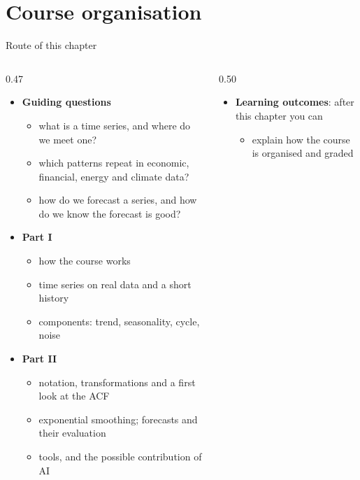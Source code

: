 \section{Course organisation}

\begin{frame}{Route of this chapter}
\itemsize{\footnotesize}
\begin{columns}[T]
\begin{column}{0.47\textwidth}
\begin{itemize}
    \item \textbf{Guiding questions}
    \begin{itemize}
        \item what is a time series, and where do we meet one?
        \item which patterns repeat in economic, financial, energy and climate data?
        \item how do we forecast a series, and how do we know the forecast is good?
    \end{itemize}
    \item \textbf{Part I}
    \begin{itemize}
        \item how the course works
        \item time series on real data and a short history
        \item components: trend, seasonality, cycle, noise
    \end{itemize}
    \item \textbf{Part II}
    \begin{itemize}
        \item notation, transformations and a first look at the ACF
        \item exponential smoothing; forecasts and their evaluation
        \item tools, and the possible contribution of AI
    \end{itemize}
\end{itemize}
\end{column}
\begin{column}{0.50\textwidth}
\begin{itemize}
    \item \textbf{Learning outcomes}: after this chapter you can
    \begin{itemize}
        \item explain how the course is organised and graded

\end{itemize}
\end{itemize}
\end{column}
\end{columns}
\end{frame}
